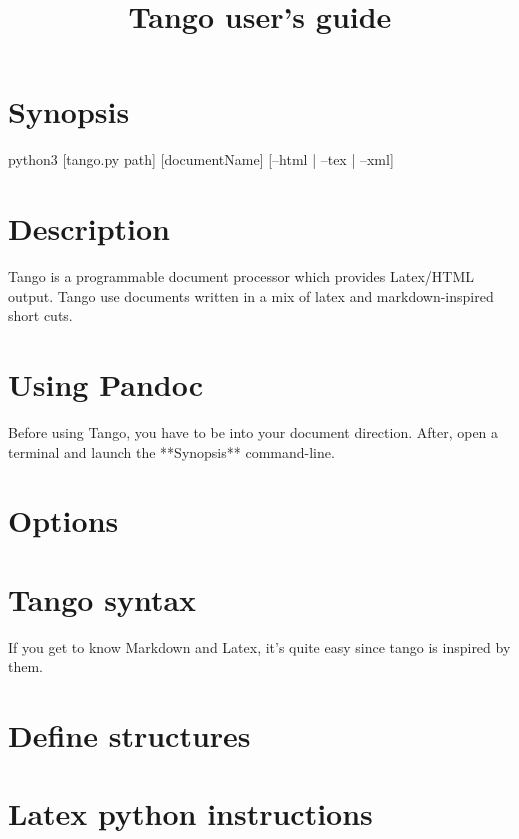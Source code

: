 \title{Tango user's guide}

\part{Synopsis}

python3 [tango.py path] [documentName] [--html | --tex | --xml]

\part{Description}

Tango is a programmable document processor which provides Latex/HTML output.
Tango use documents written in a mix of latex and markdown-inspired short cuts.

\part{Using Pandoc}

Before using Tango, you have to be into your document direction.
After, open a terminal and launch the **Synopsis** command-line.

\part{Options}



\part{Tango syntax}

If you get to know Markdown and Latex, it's quite easy since tango is inspired by them.



\part{Define structures}



\part{Latex python instructions}


